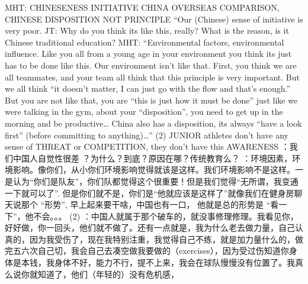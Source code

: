 \begin{CJK}{UTF8}{gbsn}
              MHT:
              CHINESENESS INITIATIVE CHINA OVERSEAS COMPARISON, CHINESE DISPOSITION NOT PRINCIPLE “Our (Chinese) sense of initiative is very poor.  JT: Why do you think its like this, really? What is the reason, is it Chinese traditional education? MHT: “Environmental factors, environmental influence.  Like you all from a young age in your environment you think its just has to be done like this.  Our environment isn’t like that.  First, you think we are all teammates, and your team all think that this principle is very important.  But we all think “it doesn’t matter, I can just go with the flow and that’s enough.” But you are not like that, you are “this is just how it must be done” just like we were talking in the gym, about your “disposition”, you need to get up in the morning and be productive… China also has a disposition, its always “have a look first” (before committing to anything)…” (2) JUNIOR athletes don’t have any sense of THREAT or COMPETITION, they don’t have this AWARENESS	：我们中国人自觉性很差
              ？为什么？到底？原因在哪？传统教育么？
              ：环境因素，环境影响。像你们，从小你们环境影响觉得就该是这样。我们环境影响不是这样。一是认为“你们是队友”，你们队都觉得这个很重要！但是我们觉得“无所谓，我变通一下就可以了”. 但是你们就不是，你们是“他就应该是这样了”就像我们在健身房聊天说那个 “形势”, 早上起来要干啥，中国也有一口， 他就是总的形势是  “看一下”，他不会。。。
              (2) ：中国人就属于那个破车的，就没事修理修理。我看见你，好好做，你一回头，他们就不做了。还有一点就是，我为什么老去做力量，自己认真的，因为我受伤了，现在我特别注重，我觉得自己不练，就是加力量什么的，做完五六次自己切，我会自己去凑空做我要做的（exercises），因为受过伤知道你身体是本钱，我身体不好，能力不行，提不上来，我会在球队慢慢没有位置了。我真么说你就知道了，他们（年轻的）没有危机感，


\end{CJK}
